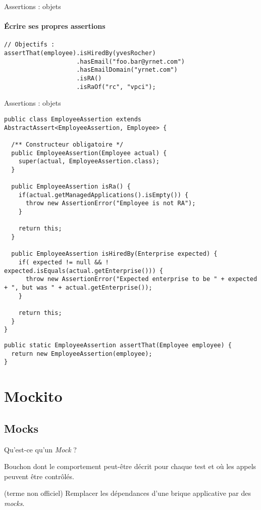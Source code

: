 \documentclass[compress]{beamer}%
\begin{document}
\begin{frame}[fragile]{Assertions : objets}
	\framesubtitle{Écrire ses propres assertions}
	
	\begin{lstlisting}
// Objectifs :
assertThat(employee).isHiredBy(yvesRocher)
                    .hasEmail("foo.bar@yrnet.com")
                    .hasEmailDomain("yrnet.com")
                    .isRA()
                    .isRaOf("rc", "vpci");
	\end{lstlisting}
	
\end{frame}

\begin{frame}[fragile]{Assertions : objets}
	\begin{lstlisting}
public class EmployeeAssertion extends AbstractAssert<EmployeeAssertion, Employee> {
  
  /** Constructeur obligatoire */
  public EmployeeAssertion(Employee actual) {
    super(actual, EmployeeAssertion.class);
  }
  
  public EmployeeAssertion isRa() {
    if(actual.getManagedApplications().isEmpty()) {
      throw new AssertionError("Employee is not RA");
    }
    
    return this;
  }
  
  public EmployeeAssertion isHiredBy(Enterprise expected) {
    if( expected != null && ! expected.isEquals(actual.getEnterprise())) {
      throw new AssertionError("Expected enterprise to be " + expected + ", but was " + actual.getEnterprise());
    }
    
    return this;
  }
}
	\end{lstlisting}
	
	\pause
	\begin{lstlisting}
public static EmployeeAssertion assertThat(Employee employee) {
  return new EmployeeAssertion(employee);
}
	\end{lstlisting}
\end{frame}


\section{Mockito}

\subsection{Mocks}

\begin{frame}{Qu'est-ce qu'un \emph{Mock} ?}

	\begin{description}[<+->]
	\item[Mock] Bouchon dont le comportement peut-être décrit pour chaque test et où les appels peuvent être contrôlés.
	\item[Mocker] (terme non officiel) Remplacer les dépendances d'une brique applicative par des \emph{mocks}.
	\end{description}

\end{frame}
\end{document}
